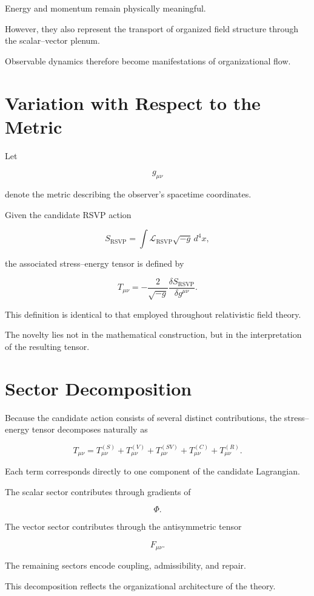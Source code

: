 \documentclass[11pt,oneside]{book}
\numberwithin{equation}{chapter}
\theoremstyle{definition}
\theoremstyle{plain}
\begin{document}
Energy and momentum remain physically meaningful.

However, they also represent the transport of organized field structure
through the scalar--vector plenum.

Observable dynamics therefore become manifestations of organizational flow.

\section{Variation with Respect to the Metric}

Let

\[
g_{\mu\nu}
\]

denote the metric describing the observer's spacetime coordinates.

Given the candidate RSVP action

\[
S_{\mathrm{RSVP}}
=
\int
\mathcal L_{\mathrm{RSVP}}
\sqrt{-g}\,
d^4x,
\]

the associated stress--energy tensor is defined by

\[
\boxed{
T_{\mu\nu}
=
-
\frac{2}{\sqrt{-g}}
\frac{\delta S_{\mathrm{RSVP}}}
{\delta g^{\mu\nu}}.
}
\]

This definition is identical to that employed throughout relativistic field
theory.

The novelty lies not in the mathematical construction, but in the
interpretation of the resulting tensor.

\section{Sector Decomposition}

Because the candidate action consists of several distinct contributions, the
stress--energy tensor decomposes naturally as

\[
T_{\mu\nu}
=
T^{(S)}_{\mu\nu}
+
T^{(V)}_{\mu\nu}
+
T^{(SV)}_{\mu\nu}
+
T^{(C)}_{\mu\nu}
+
T^{(R)}_{\mu\nu}.
\]

Each term corresponds directly to one component of the candidate
Lagrangian.

The scalar sector contributes through gradients of

\[
\Phi.
\]

The vector sector contributes through the antisymmetric tensor

\[
F_{\mu\nu}.
\]

The remaining sectors encode coupling, admissibility, and repair.

This decomposition reflects the organizational architecture of the theory.
\end{document}
